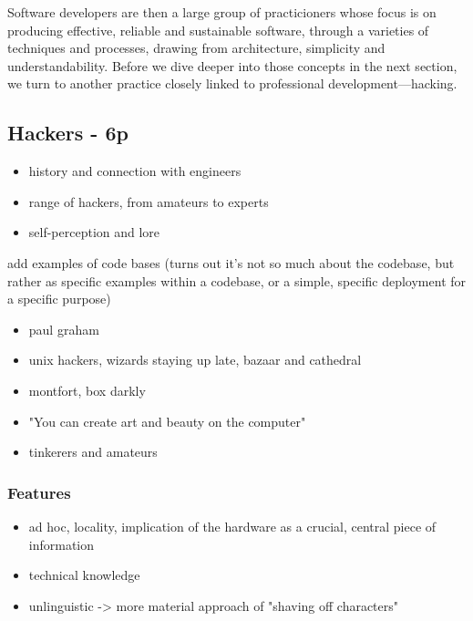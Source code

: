 \vspace*{1\baselineskip}

Software developers are then a large group of practicioners whose focus is on producing effective, reliable and sustainable software, through a varieties of techniques and processes, drawing from architecture, simplicity and understandability. Before we dive deeper into those concepts in the next section, we turn to another practice closely linked to professional development—hacking.

\vspace*{2\baselineskip}

\subsection{Hackers - 6p}

\begin{itemize}
    \item history and connection with engineers
    \item range of hackers, from amateurs to experts
    \item self-perception and lore
\end{itemize}

add examples of code bases (turns out it's not so much about the codebase, but rather as specific examples within a codebase, or a simple, specific deployment for a specific purpose)

\begin{itemize}
    \item paul graham
    \item unix hackers, wizards staying up late, bazaar and cathedral
    \item montfort, box darkly
    \item "You can create art and beauty on the computer"
    \item tinkerers and amateurs
\end{itemize}

\subsubsection{Features}

\begin{itemize}
    \item ad hoc, locality, implication of the hardware as a crucial, central piece of information
    \item technical knowledge
    \item unlinguistic -> more material approach of "shaving off characters"
\end{itemize}


